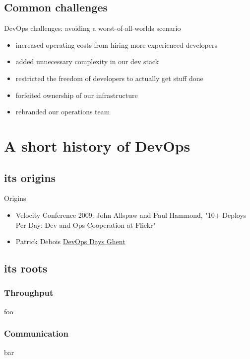 \documentclass{beamer}
\begin{document}
	\subsection{Common challenges}
	\begin{frame}{DevOps challenges: avoiding a worst-of-all-worlds scenario}
		\begin{itemize}
			\item increased operating costs from hiring more experienced developers \pause
			\item added unnecessary complexity in our dev stack \pause
			\item restricted the freedom of developers to actually get stuff done \pause
			\item forfeited ownership of our infrastructure \pause 
			\item rebranded our operations team
		\end{itemize}
	\end{frame}
	\section{A short history of DevOps}
	\subsection{its origins}
	\begin{frame}{Origins}
		\begin{itemize}
			\item Velocity Conference 2009: John Allspaw and Paul Hammond, "10+ Deploys Per Day: Dev and Ops Cooperation at Flickr" \pause
			\item Patrick Debois \href{https://youtu.be/EOveXZhJpr4}{DevOps Days Ghent}
		\end{itemize}
	\end{frame}
	\subsection{its roots}
	\subsubsection{Throughput}
	\begin{frame}
		foo
		\end{frame}
	\subsubsection{Communication}
	\begin{frame}
		bar
		\end{frame}
\end{document}
